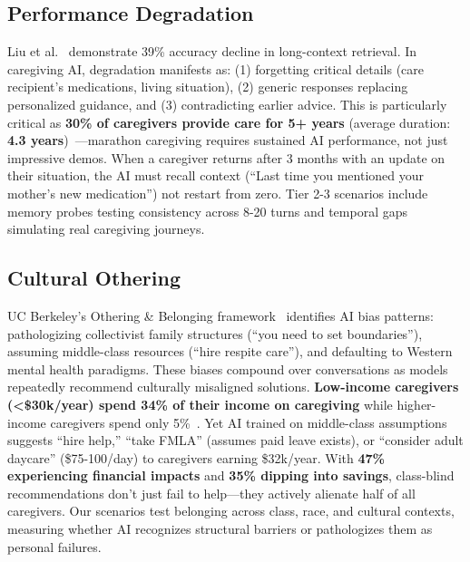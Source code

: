 \documentclass{article}%
\begin{document}
%
\subsection{Performance Degradation}%
\label{subsec:PerformanceDegradation}%
Liu et al.~\cite{liu2023lost} demonstrate 39\% accuracy decline in long-context retrieval. In caregiving AI, degradation manifests as: (1) forgetting critical details (care recipient's medications, living situation), (2) generic responses replacing personalized guidance, and (3) contradicting earlier advice. This is particularly critical as \textbf{30\% of caregivers provide care for 5+ years} (average duration: \textbf{4.3 years})~\cite{aarp2025}—marathon caregiving requires sustained AI performance, not just impressive demos. When a caregiver returns after 3 months with an update on their situation, the AI must recall context (``Last time you mentioned your mother's new medication'') not restart from zero. Tier 2-3 scenarios include memory probes testing consistency across 8-20 turns and temporal gaps simulating real caregiving journeys.

%
\subsection{Cultural Othering}%
\label{subsec:CulturalOthering}%
UC Berkeley's Othering \& Belonging framework~\cite{berkeley2024} identifies AI bias patterns: pathologizing collectivist family structures (``you need to set boundaries''), assuming middle-class resources (``hire respite care''), and defaulting to Western mental health paradigms. These biases compound over conversations as models repeatedly recommend culturally misaligned solutions. \textbf{Low-income caregivers (<\$30k/year) spend 34\% of their income on caregiving} while higher-income caregivers spend only 5\%~\cite{aarp2025}. Yet AI trained on middle-class assumptions suggests ``hire help,'' ``take FMLA'' (assumes paid leave exists), or ``consider adult daycare'' (\$75-100/day) to caregivers earning \$32k/year. With \textbf{47\% experiencing financial impacts} and \textbf{35\% dipping into savings}, class-blind recommendations don't just fail to help—they actively alienate half of all caregivers. Our scenarios test belonging across class, race, and cultural contexts, measuring whether AI recognizes structural barriers or pathologizes them as personal failures.

%
\end{document}
